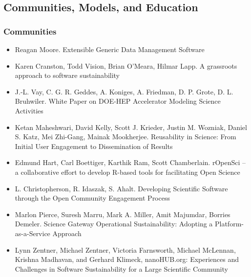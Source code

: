 \documentclass[11pt, oneside]{amsart}
\begin{document}
\subsection*{Communities, Models, and Education}

\subsubsection*{Communities}

\begin{itemize}

\item Reagan Moore. Extensible Generic Data Management Software~\cite{Moore_WSSSPE}

\item Karen Cranston, Todd Vision, Brian O'Meara, Hilmar Lapp. A
  grassroots approach to software sustainability~\cite{Cranston_WSSSPE}

\item J.-L. Vay, C. G. R. Geddes, A. Koniges, A. Friedman,
  D. P. Grote, D. L. Bruhwiler. White Paper on DOE-HEP Accelerator
  Modeling Science Activities~\cite{Vay_WSSSPE}

\item Ketan Maheshwari, David Kelly, Scott J. Krieder, Justin
  M. Wozniak, Daniel S. Katz, Mei Zhi-Gang, Mainak
  Mookherjee. Reusability in Science: From Initial User Engagement to
  Dissemination of Results~\cite{Maheshwari_WSSSPE}

\item Edmund Hart, Carl Boettiger, Karthik Ram, Scott
  Chamberlain. rOpenSci -- a collaborative effort to develop R-based
  tools for facilitating Open Science~\cite{Hart_WSSSPE}

\item L. Christopherson, R. Idaszak, S. Ahalt. Developing Scientific
  Software through the Open Community Engagement
  Process~\cite{Christopherson_WSSSPE}

\item Marlon Pierce, Suresh Marru, Mark A. Miller, Amit Majumdar,
  Borries Demeler. Science Gateway Operational Sustainability:
  Adopting a Platform-as-a-Service Approach~\cite{Pierce2_WSSSPE}

\item Lynn Zentner, Michael Zentner, Victoria Farnsworth, Michael
  McLennan, Krishna Madhavan, and Gerhard Klimeck, nanoHUB.org:
  Experiences and Challenges in Software Sustainability for a Large
  Scientific Community~\cite{Zentner_WSSSPE}


\end{itemize}
\end{document}

